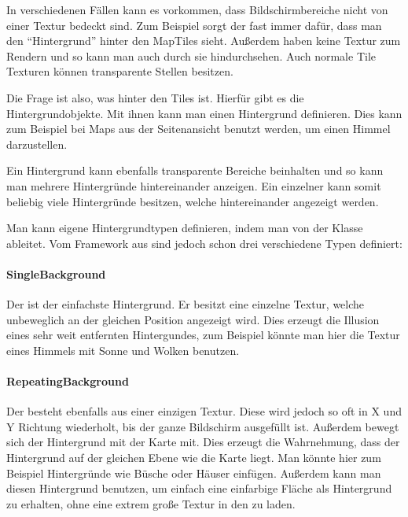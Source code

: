 In verschiedenen Fällen kann es vorkommen, dass Bildschirmbereiche nicht von einer Textur bedeckt sind. Zum Beispiel sorgt der  fast immer dafür, dass man den ``Hintergrund'' hinter den MapTiles sieht. Außerdem haben  keine Textur zum Rendern und so kann man auch durch sie hindurchsehen. Auch normale Tile Texturen können transparente Stellen besitzen.

Die Frage ist also, was hinter den Tiles ist. Hierfür gibt es die Hintergrundobjekte. Mit ihnen kann man einen Hintergrund definieren.
Dies kann zum Beispiel bei Maps aus der Seitenansicht benutzt werden, um einen Himmel darzustellen.


Ein Hintergrund kann ebenfalls transparente Bereiche beinhalten und so kann man mehrere Hintergründe hintereinander anzeigen. Ein einzelner  kann somit beliebig viele Hintergründe besitzen, welche hintereinander angezeigt werden. 

Man kann eigene Hintergrundtypen definieren, indem man von der Klasse  ableitet. Vom Framework aus sind jedoch schon drei verschiedene Typen definiert:

\paragraph{SingleBackground}

Der  ist der einfachste Hintergrund. Er besitzt eine einzelne Textur, welche unbeweglich an der gleichen Position angezeigt wird.
Dies erzeugt die Illusion eines sehr weit entfernten Hintergundes, zum Beispiel könnte man hier die Textur eines Himmels mit Sonne und Wolken benutzen.

\paragraph{RepeatingBackground}

Der  besteht ebenfalls aus einer einzigen Textur. Diese wird jedoch so oft in X und Y Richtung wiederholt, bis der ganze Bildschirm ausgefüllt ist. Außerdem bewegt sich der Hintergrund mit der Karte mit. Dies erzeugt die Wahrnehmung, dass der Hintergrund auf der gleichen Ebene wie die Karte liegt. Man könnte hier zum Beispiel Hintergründe wie Büsche oder Häuser einfügen. 
Außerdem kann man diesen Hintergrund benutzen, um einfach eine einfarbige Fläche als Hintergrund zu erhalten, ohne eine extrem große Textur in den  zu laden.

